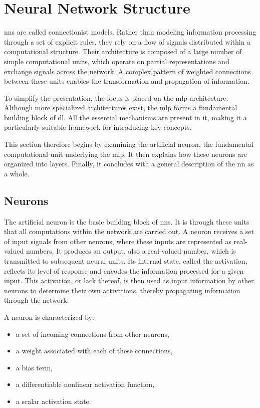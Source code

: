 \section{Neural Network Structure}\label{sec:neural_networks_structure}

\glspl{nn} are called connectionist models.
Rather than modeling information processing through a set of explicit rules, they rely on a flow of signals distributed within a computational structure.
Their architecture is composed of a large number of simple computational units, which operate on partial representations and exchange signals across the network.
A complex pattern of weighted connections between these units enables the transformation and propagation of information.

To simplify the presentation, the focus is placed on the \gls{mlp} architecture.
Although more specialized architectures exist, the \gls{mlp} forms a fundamental building block of \gls{dl}.
All the essential mechanisms are present in it, making it a particularly suitable framework for introducing key concepts.

This section therefore begins by examining the artificial neuron, the fundamental computational unit underlying the \gls{mlp}.
It then explains how these neurons are organized into layers.
Finally, it concludes with a general description of the \gls{nn} as a whole.

\subsection{Neurons}

The artificial neuron is the basic building block of \glspl{nn}.
It is through these units that all computations within the network are carried out.
A neuron receives a set of input signals from other neurons, where these inputs are represented as real-valued numbers.
It produces an output, also a real-valued number, which is transmitted to subsequent neural units.
Its internal state, called the activation, reflects its level of response and encodes the information processed for a given input.
This activation, or lack thereof, is then used as input information by other neurons to determine their own activations, thereby propagating information through the network.

A neuron is characterized by:
\begin{itemize}
\item a set of incoming connections from other neurons,
\item a weight associated with each of these connections,
\item a bias term,
\item a differentiable nonlinear activation function,
\item a scalar activation state.
\end{itemize}

